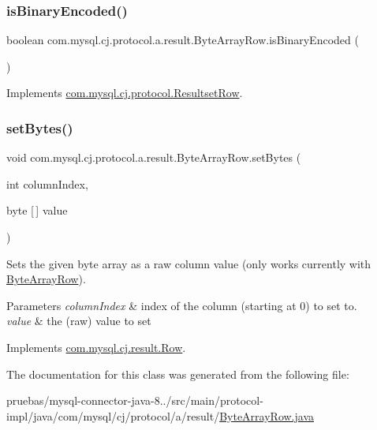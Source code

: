 \subsubsection{\texorpdfstring{is\+Binary\+Encoded()}{isBinaryEncoded()}}
{\footnotesize\ttfamily boolean com.\+mysql.\+cj.\+protocol.\+a.\+result.\+Byte\+Array\+Row.\+is\+Binary\+Encoded (\begin{DoxyParamCaption}{ }\end{DoxyParamCaption})}



Implements \mbox{\hyperlink{interfacecom_1_1mysql_1_1cj_1_1protocol_1_1_resultset_row_a7460706550d3aea6a340ff6676bd7062}{com.\+mysql.\+cj.\+protocol.\+Resultset\+Row}}.

\mbox{\label{classcom_1_1mysql_1_1cj_1_1protocol_1_1a_1_1result_1_1_byte_array_row_a2606ac2688da3531d2e72bfd51949632}} 
\subsubsection{\texorpdfstring{set\+Bytes()}{setBytes()}}
{\footnotesize\ttfamily void com.\+mysql.\+cj.\+protocol.\+a.\+result.\+Byte\+Array\+Row.\+set\+Bytes (\begin{DoxyParamCaption}\item[{int}]{column\+Index,  }\item[{byte \mbox{[}$\,$\mbox{]}}]{value }\end{DoxyParamCaption})}

Sets the given byte array as a raw column value (only works currently with \mbox{\hyperlink{classcom_1_1mysql_1_1cj_1_1protocol_1_1a_1_1result_1_1_byte_array_row}{Byte\+Array\+Row}}).


\begin{DoxyParams}{Parameters}
{\em column\+Index} & index of the column (starting at 0) to set to. \\
\hline
{\em value} & the (raw) value to set \\
\hline
\end{DoxyParams}


Implements \mbox{\hyperlink{interfacecom_1_1mysql_1_1cj_1_1result_1_1_row_aaa1223e3df4e0f2b1b383d86095e7789}{com.\+mysql.\+cj.\+result.\+Row}}.



The documentation for this class was generated from the following file\+:\begin{DoxyCompactItemize}
\item 
pruebas/mysql-\/connector-\/java-\/8../src/main/protocol-\/impl/java/com/mysql/cj/protocol/a/result/\mbox{\hyperlink{_byte_array_row_8java}{Byte\+Array\+Row.\+java}}\end{DoxyCompactItemize}
